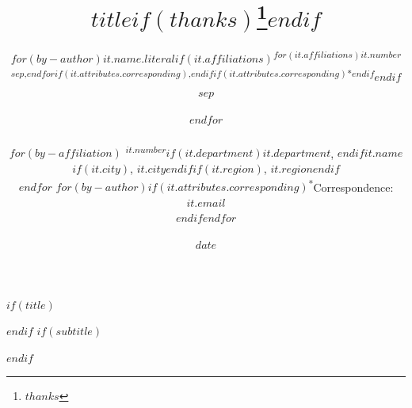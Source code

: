 $if(title)$
\title{$title$$if(thanks)$\thanks{$thanks$}$endif$}
$endif$
$if(subtitle)$
\usepackage{etoolbox}
\makeatletter
\providecommand{\subtitle}[1]{%
  \apptocmd{\@title}{\par {\large #1 \par}}{}{}
}
\makeatother
\subtitle{$subtitle$}
$endif$
\author{%
$for(by-author)$$it.name.literal$$if(it.affiliations)$\textsuperscript{$for(it.affiliations)$$it.number$$sep$,$endfor$$if(it.attributes.corresponding)$,$endif$$if(it.attributes.corresponding)$*$endif$}$endif$$sep$ \and $endfor$%
\\[0.75em]
\begin{minipage}{0.9\textwidth}\centering\small
$for(by-affiliation)$%
\textsuperscript{$it.number$}$if(it.department)$$it.department$, $endif$$it.name$$if(it.city)$, $it.city$$endif$$if(it.region)$, $it.region$$endif$\\
$endfor$%
$for(by-author)$$if(it.attributes.corresponding)$\textsuperscript{*}Correspondence: \href{mailto:$it.email$}{$it.email$}\\$endif$$endfor$%
\end{minipage}}
\date{$date$}
